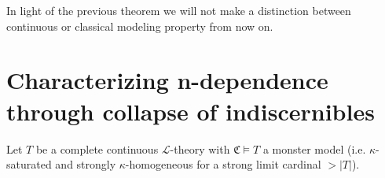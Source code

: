 \documentclass{amsart}
\newtheorem{teor}{Theorem}[section]
\newtheorem{lema}[teor]{Lemma}
\newtheorem{cor}[teor]{Corollary}
\newtheorem{external claim}[teor]{Claim}
\newcommand{\C}{{\mathfrak C}}
\newcommand{\mL}{\mathcal{L}}
\newcommand{\I}{\mathcal{I}}
\DeclareMathOperator{\age}{{Age}}
\begin{document}
In light of the previous theorem we will not make a distinction between continuous or classical modeling property from now on.

\section{Characterizing n-dependence through collapse of indiscernibles}\label{section:n-dep}
Let $T$ be a complete continuous $\mL$-theory with $\C\models T$ a monster model (i.e. $\kappa$-saturated and strongly $\kappa$-homogeneous for a strong limit cardinal $> |T|$). %
\end{document}
